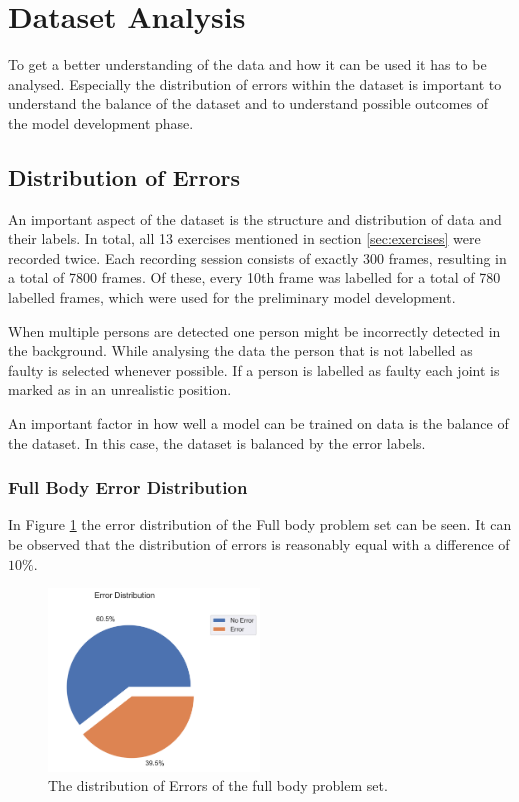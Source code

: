 \section{Dataset Analysis}
\label{sec:dataset}

To get a better understanding of the data and how it can be used it has to be analysed. Especially the distribution of errors within the dataset is important to understand the balance of the dataset and to understand possible outcomes of the model development phase.

\subsection{Distribution of Errors}

An important aspect of the dataset is the structure and distribution of data and their labels. In total, all 13 exercises mentioned in section \ref{sec:exercises} were recorded twice. Each recording session consists of exactly 300 frames, resulting in a total of 7800 frames. Of these, every 10th frame was labelled for a total of 780 labelled frames, which were used for the preliminary model development.

When multiple persons are detected one person might be incorrectly detected in the background. While analysing the data the person that is not labelled as faulty is selected whenever possible. If a person is labelled as faulty each joint is marked as in an unrealistic position.

An important factor in how well a model can be trained on data is the balance of the dataset. In this case, the dataset is balanced by the error labels. 

\subsubsection{Full Body Error Distribution}

In Figure \ref{fig:fb_pie} the error distribution of the Full body problem set can be seen. It can be observed that the distribution of errors is reasonably equal with a difference of $10\%$. 

\begin{figure}[ht]
  \centering
  \includegraphics[width=0.5\textwidth]{figures/Data/dist_full_body/Error_Distribution.png}
  \caption[Error Distribution of the Full Body]{The distribution of Errors of the full body problem set.}
  \label{fig:fb_pie}
\end{figure}

